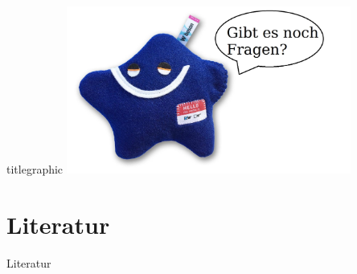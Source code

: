 \documentclass[aspectratio=1610, 9pt]{beamer}
\begin{document}
\begin{frame}
  \begin{beamercolorbox}[center, wd=\textwidth]{titlegraphic}
    \includegraphics[width=0.7\textwidth]{images/particle_zoo.jpg}
  \end{beamercolorbox}%
\end{frame}


%

\section{Literatur}
\begin{frame}[allowframebreaks]{Literatur}
  \printbibliography
\end{frame}

\nocite{comparison}
\nocite{tevatron}
\nocite{particle_zoo}
\end{document}
